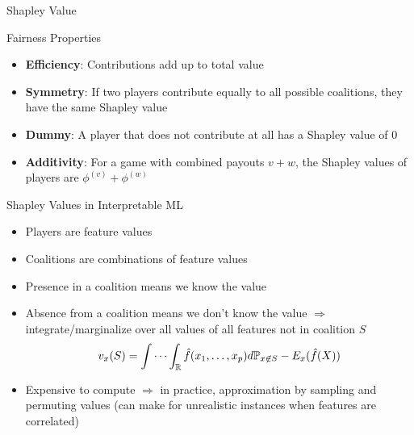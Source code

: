 \documentclass[ignorenonframetext,xcolor=x11names]{beamer}
\begin{document}
\begin{frame}{Shapley Value}
\begin{block}{Fairness Properties}
\begin{itemize}
   \item \textbf{Efficiency}: Contributions add up to total value
   \item \textbf{Symmetry}: If two players contribute equally to all possible coalitions, they have the same Shapley value
   \item \textbf{Dummy}: A player that does not contribute at all has a Shapley value of $0$
   \item \textbf{Additivity}: For a game with combined payouts $v + w$, the Shapley values of players are $\phi^{(v)} + \phi^{(w)}$
\end{itemize}
\end{block}
\end{frame}

\begin{frame}{Shapley Values in Interpretable ML}
\begin{itemize}
   \item Players are feature values
   \item Coalitions are combinations of feature values
   \item Presence in a coalition means we know the value
   \item Absence from a coalition means we don't know the value $\Rightarrow$ integrate/marginalize over all values of all features not in coalition $S$
   \begin{align*}
   v_x(S) = \idotsint_\Bbb{R} \hat{f}(x_1, \ldots, x_p) d\Bbb{P}_{x \not\in S} - E_x(\hat{f}(X))
   \end{align*}
   \item Expensive to compute $\Rightarrow$ in practice, approximation by sampling and permuting values (can make for unrealistic instances when features are correlated)
\end{itemize}
\end{frame}
\end{document}
